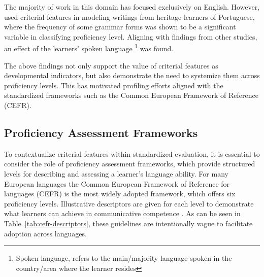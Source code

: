 The majority of work in this domain has focused exclusively on English. However, \citet{akef2025} used criterial
features in modeling writings from heritage learners of Portuguese,  where the frequency of some grammar forms
was shown
to be a significant variable in classifying proficiency level. Aligning with findings from other studies, an effect
of the learners' spoken language
\footnote{Spoken language, refers to the main/majority language spoken in the country/area where the learner resides}
was found.

The above findings not only support the value of criterial features as developmental indicators, but also
demonstrate the need to systemize them across proficiency levels. This has motivated profiling efforts \cite{Saville2010}
aligned
with
the standardized frameworks such as the Common European Framework of Reference (CEFR).



\subsection{Proficiency Assessment Frameworks}



To contextualize criterial features within standardized evaluation, it is essential to consider the role of
proficiency assessment frameworks, which provide structured levels for describing and assessing a learner's language
ability. For many European languages the Common European Framework of Reference for languages (CEFR) is the most
widely adopted framework, which offers six proficiency levels. Illustrative
descriptors are given for each level to demonstrate what learners can achieve in communicative
competence \citep{CEFR2020}. As can be seen in Table~\ref{tab:cefr-descriptors}, these guidelines are intentionally
vague to facilitate
adoption
across
languages.

